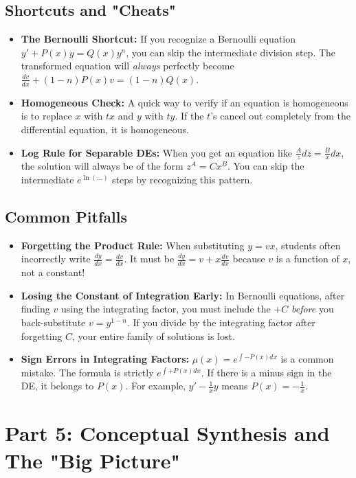 \documentclass[11pt]{article}
\begin{document}
\subsection{Shortcuts and "Cheats"}
\begin{itemize}
    \item \textbf{The Bernoulli Shortcut:} If you recognize a Bernoulli equation $y' + P(x)y = Q(x)y^n$, you can skip the intermediate division step. The transformed equation will \textit{always} perfectly become $\frac{dv}{dx} + (1-n)P(x)v = (1-n)Q(x)$. 
    \item \textbf{Homogeneous Check:} A quick way to verify if an equation is homogeneous is to replace $x$ with $tx$ and $y$ with $ty$. If the $t$'s cancel out completely from the differential equation, it is homogeneous.
    \item \textbf{Log Rule for Separable DEs:} When you get an equation like $\frac{A}{z} dz = \frac{B}{x} dx$, the solution will always be of the form $z^A = C x^B$. You can skip the intermediate $e^{\ln(...)}$ steps by recognizing this pattern.
\end{itemize}

\subsection{Common Pitfalls}
\begin{itemize}
    \item \textbf{Forgetting the Product Rule:} When substituting $y=vx$, students often incorrectly write $\frac{dy}{dx} = \frac{dv}{dx}$. It must be $\frac{dy}{dx} = v + x\frac{dv}{dx}$ because $v$ is a function of $x$, not a constant!
    \item \textbf{Losing the Constant of Integration Early:} In Bernoulli equations, after finding $v$ using the integrating factor, you must include the $+C$ \textit{before} you back-substitute $v = y^{1-n}$. If you divide by the integrating factor after forgetting $C$, your entire family of solutions is lost.
    \item \textbf{Sign Errors in Integrating Factors:} $\mu(x) = e^{\int -P(x) dx}$ is a common mistake. The formula is strictly $e^{\int +P(x) dx}$. If there is a minus sign in the DE, it belongs to $P(x)$. For example, $y' - \frac{1}{x}y$ means $P(x) = -\frac{1}{x}$.
\end{itemize}

\newpage
\section{Part 5: Conceptual Synthesis and The "Big Picture"}
\end{document}
